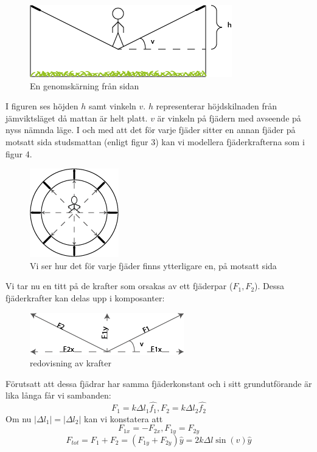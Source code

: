 \documentclass[10pt,a4paper]{article}
\begin{document}
\begin{figure}[ht]
\begin{center}
\includegraphics[scale=0.8]{fransidan}
\caption{En genomskärning från sidan}
\end{center}
\end{figure}
I figuren ses höjden $h$ samt vinkeln $v$. $h$ representerar höjdskilnaden från jämviktsläget då mattan är helt platt. $v$ är vinkeln på fjädern med avseende på nyss nämnda läge.
I och med att det för varje fjäder sitter en annan fjäder på motsatt sida studsmattan (enligt figur 3) kan vi modellera fjäderkrafterna som i figur 4.
\begin{figure}[ht]
\begin{center}
\includegraphics[scale=1]{ovanifran}
\caption{Vi ser hur det för varje fjäder finns ytterligare en, på motsatt sida}
\end{center}
\end{figure}

Vi tar nu en titt på de krafter som orsakas av ett fjäderpar ($F_1,F_2$). Dessa fjäderkrafter kan delas upp i komposanter:
\begin{figure}[ht]
\begin{center}
\includegraphics[scale=1]{krafter}
\caption{redovisning av krafter}
\end{center}
\end{figure}

Förutsatt att dessa fjädrar har samma fjäderkonstant och i sitt grundutförande är lika långa får vi sambanden:
$$F_1=k\Delta l_1\hat{f_1}, F_2=k\Delta l_2\hat{f_2}$$
Om nu $|\Delta l_1|=|\Delta l_2|$ kan vi konstatera att
$$F_{1x}=-F_{2x}, F_{1y}=F_{2y}$$
$$F_{tot}=F_1+F_2=(F_{1y}+F_{2y})\hat{y}=2k\Delta l\sin(v)\hat{y}$$
\end{document}
